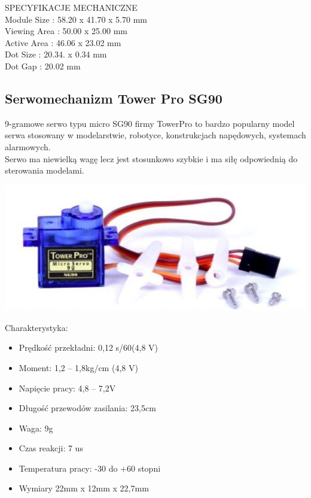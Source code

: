 \documentclass{classrep}
\begin{document}
SPECYFIKACJE MECHANICZNE\\
Module Size   	:  58.20 x 41.70 x 5.70 mm\\
Viewing Area 	:  50.00 x 25.00 mm\\
Active Area 	:  46.06 x 23.02 mm\\
Dot Size		: 20.34. x 0.34 mm\\
Dot Gap 		: 20.02 mm\\

\subsection {Serwomechanizm Tower Pro SG90}
9-gramowe serwo typu micro SG90 firmy TowerPro to bardzo popularny model serwa stosowany w modelarstwie, robotyce, konstrukcjach napędowych, systemach alarmowych.\\

Serwo ma niewielką wagę lecz jest stosunkowo szybkie i ma siłę odpowiednią do sterowania modelami.\\

\begin{center}
\includegraphics[scale=0.5]{SG90}\\
\end{center}

Charakterystyka:
\begin{itemize}
  \item Prędkość przekładni: 0,12 s/60\degree (4,8 V)
  \item Moment: 1,2 – 1,8kg/cm (4,8 V)
  \item Napięcie pracy: 4,8 – 7,2V
  \item Długość przewodów zasilania: 23,5cm
  \item Waga: 9g
  \item Czas reakcji: 7 us
  \item Temperatura pracy: -30 do +60 stopni
  \item Wymiary 22mm x 12mm x 22,7mm\\
\end{itemize}
\end{document}
